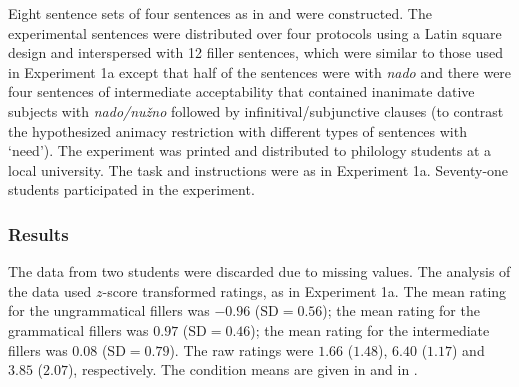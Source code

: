 \documentclass[output=paper]{langscibook}
\begin{document}
\noindent Eight sentence sets of four sentences as in  and  were constructed. The experimental sentences were distributed over four protocols using a Latin square design and interspersed with 12 filler sentences, which were similar to those used in Experiment 1a except that half of the sentences were with \textit{nado} and there were four sentences of intermediate acceptability that contained inanimate dative subjects with \textit{nado/nužno} followed by infinitival/subjunctive clauses (to contrast the hypothesized animacy restriction with different types of sentences with `need'). The experiment was printed and distributed to philology students at a local university. The task and instructions were as in Experiment 1a. Seventy-one students participated in the experiment.

\subsubsection{Results}

The data from two students were discarded due to missing values. The analysis of the data used $z$-score transformed ratings, as in Experiment 1a. The mean rating for the ungrammatical fillers was $-0.96$ ($\text{SD} =0.56$); the mean rating for the grammatical fillers was $0.97$ ($\text{SD} =0.46$); the mean rating for the intermediate fillers was $0.08$ ($\text{SD} =0.79$). The raw ratings were $1.66$ ($1.48$),  $6.40$ ($1.17$) and $3.85$ ($2.07$), respectively. The condition means are given in  and in .\largerpage

\end{document}
